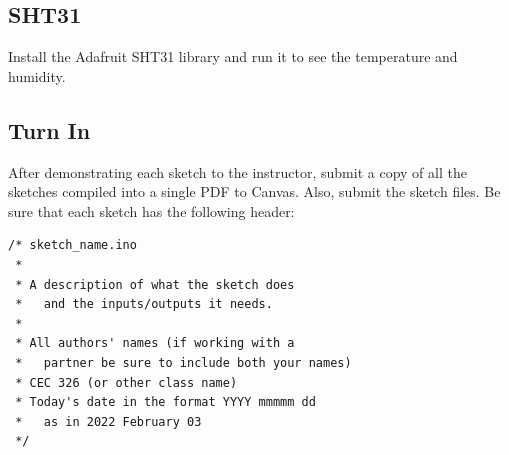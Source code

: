 \subsection{SHT31}
Install the Adafruit SHT31 library and run it to see the temperature and humidity.


\subsection{Turn In}
After demonstrating each sketch to the instructor, submit a copy of all the sketches compiled into a single PDF to Canvas. Also, submit the sketch files. Be sure that each sketch has the following 
header:
\begin{lstlisting}
/* sketch_name.ino
 *
 * A description of what the sketch does 
 *   and the inputs/outputs it needs.
 *
 * All authors' names (if working with a 
 *   partner be sure to include both your names)
 * CEC 326 (or other class name)
 * Today's date in the format YYYY mmmmm dd 
 *   as in 2022 February 03
 */
\end{lstlisting}